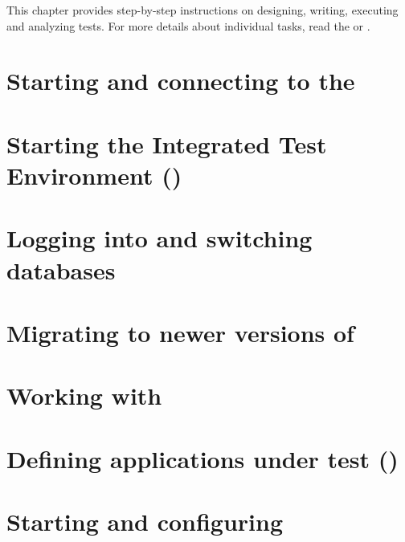 %
This chapter provides step-by-step instructions on designing, writing, executing and analyzing tests. 
For more details about individual tasks, read the 
 or . 

\section{Starting and connecting to the \gdagent}


\section{Starting the Integrated Test Environment (\ite{})}


\section{Logging into and switching databases}


\section{Migrating to newer versions of \app{}}


\clearpage

\section{Working with \gdprojects{}}
\label{WorkingWithProjects}


\clearpage
\section{Defining applications under test (\gdauts{})}
\label{Defineaut}


\section{Starting and configuring \gdauts{}}
\label{StartAUT}


\clearpage
